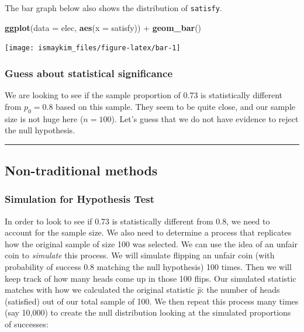 \documentclass[]{tufte-book}
\newenvironment{Shaded}{\begin{snugshade}}{\end{snugshade}}
\newcommand{\KeywordTok}[1]{\textcolor[rgb]{0.13,0.29,0.53}{\textbf{{#1}}}}
\newcommand{\DataTypeTok}[1]{\textcolor[rgb]{0.13,0.29,0.53}{{#1}}}
\newcommand{\StringTok}[1]{\textcolor[rgb]{0.31,0.60,0.02}{{#1}}}
\newcommand{\NormalTok}[1]{{#1}}
\let\oldrule=\rule
\renewcommand{\rule}[1]{\oldrule{\linewidth}}
\theoremstyle{definition}
\theoremstyle{definition}
\theoremstyle{remark}
\begin{document}
The bar graph below also shows the distribution of \texttt{satisfy}.

\begin{Shaded}
\begin{Highlighting}[]
\KeywordTok{ggplot}\NormalTok{(}\DataTypeTok{data =} \NormalTok{elec, }\KeywordTok{aes}\NormalTok{(}\DataTypeTok{x =} \NormalTok{satisfy)) +}\StringTok{ }\KeywordTok{geom_bar}\NormalTok{()}
\end{Highlighting}
\end{Shaded}

\begin{center}\texttt{[image: ismaykim\_files/figure-latex/bar-1]} \end{center}

\subsubsection{Guess about statistical
significance}\label{guess-about-statistical-significance-1}

We are looking to see if the sample proportion of 0.73 is statistically
different from \(p_0 = 0.8\) based on this sample. They seem to be quite
close, and our sample size is not huge here (\(n = 100\)). Let's guess
that we do not have evidence to reject the null hypothesis.

\begin{center}\rule{0.5\linewidth}{\linethickness}\end{center}

\subsection{Non-traditional methods}\label{non-traditional-methods-1}

\subsubsection{Simulation for Hypothesis
Test}\label{simulation-for-hypothesis-test}

In order to look to see if 0.73 is statistically different from 0.8, we
need to account for the sample size. We also need to determine a process
that replicates how the original sample of size 100 was selected. We can
use the idea of an unfair coin to \emph{simulate} this process. We will
simulate flipping an unfair coin (with probability of success 0.8
matching the null hypothesis) 100 times. Then we will keep track of how
many heads come up in those 100 flips. Our simulated statistic matches
with how we calculated the original statistic \(\hat{p}\): the number of
heads (satisfied) out of our total sample of 100. We then repeat this
process many times (say 10,000) to create the null distribution looking
at the simulated proportions of successes:
\end{document}

